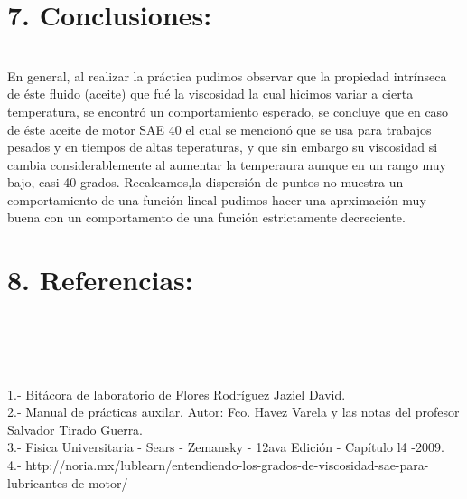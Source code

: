 \documentclass[10pt,a4paper]{article}
\begin{document}
\section*{7. Conclusiones:}\\
En general, al realizar la pr\'{a}ctica pudimos observar que la propiedad intr\'{i}nseca de \'{e}ste fluido (aceite) que fu\'{e} la viscosidad la cual hicimos variar a cierta temperatura, se encontr\'{o} un comportamiento esperado, se concluye que en caso de \'{e}ste aceite de motor SAE 40 el cual se mencion\'{o} que se usa para trabajos pesados y en tiempos de altas teperaturas, y que sin embargo su viscosidad si cambia considerablemente al aumentar la temperaura aunque en un rango muy bajo, casi 40 grados. Recalcamos,la dispersi\'{o}n de puntos no muestra un comportamiento de una funci\'{o}n lineal pudimos hacer una aprximaci\'{o}n muy buena con un comportamento de una funci\'{o}n estrictamente decreciente. 
\section*{8. Referencias:}\\
\\
\medskip
\\
\\1.- Bit\'{a}cora de laboratorio de Flores Rodr\'{i}guez Jaziel David.
\\
2.- Manual de pr\'{a}cticas auxilar. Autor: Fco. Havez Varela y las notas del profesor Salvador Tirado Guerra.
\\
3.- Fisica Universitaria - Sears - Zemansky - 12ava Edici\'{o}n - Cap\'{i}tulo l4 -2009.\\
4.- http://noria.mx/lublearn/entendiendo-los-grados-de-viscosidad-sae-para-lubricantes-de-motor/ \\
\end{document}
